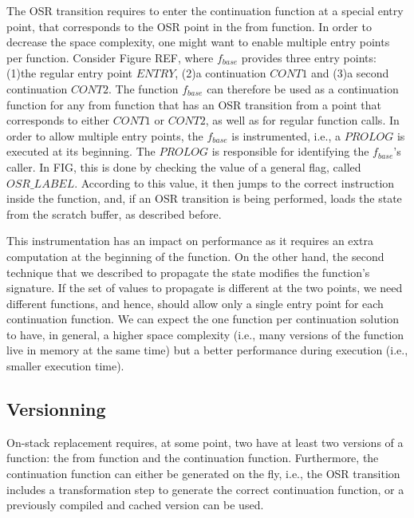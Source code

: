 
The OSR transition requires to enter the continuation function at a special entry point, that corresponds to the OSR point in the from function.
In order to decrease the space complexity, one might want to enable multiple entry points per function.
Consider Figure REF, where $f_{base}$ provides three entry points: (1)the regular entry point $ENTRY$, (2)a continuation $CONT1$ and (3)a second continuation $CONT2$.
The function $f_{base}$ can therefore be used as a continuation function for any from function that has an OSR transition from a point that corresponds to either $CONT1$ or $CONT2$, as well as for regular function calls.
In order to allow multiple entry points, the $f_{base}$ is instrumented, i.e., a $PROLOG$ is executed at its beginning.
The $PROLOG$ is responsible for identifying the $f_{base}$'s caller. 
In FIG, this is done by checking the value of a general flag, called $OSR\_LABEL$.
According to this value, it then jumps to the correct instruction inside the function, and, if an OSR transition is being performed, loads the state from the scratch buffer, as described before.

This instrumentation has an impact on performance as it requires an extra computation at the beginning of the function. 
On the other hand, the second technique that we described to propagate the state modifies the function's signature.
If the set of values to propagate is different at the two points, we need different functions, and hence, should allow only a single entry point for each continuation function.
We can expect the one function per continuation solution to have, in general, a higher space complexity (i.e., many versions of the function live in memory at the same time) but a better performance during execution (i.e., smaller execution time).\\

\subsection{Versionning}
On-stack replacement requires, at some point, two have at least two versions of a function: the from function and the continuation function.
Furthermore, the continuation function can either be generated on the fly, i.e., the OSR transition includes a transformation step to generate the correct continuation function, or a previously compiled and cached version can be used.

